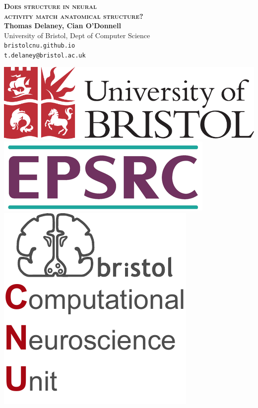 \documentclass[a0,portrait]{a0poster}
\begin{document}

\begin{minipage}[b]{0.75\linewidth}
  \veryHuge \color{NavyBlue} \textbf{\textsc{Does structure in neural \\[0.3cm] activity match anatomical structure?}} \color{Black}\\[1cm] %
  \huge \textbf{Thomas Delaney, Cian O'Donnell}\\[0.3cm] %
  \huge University of Bristol, Dept of Computer Science\\[0.1cm] %
  \large \texttt{bristolcnu.github.io} \\
  \Large \texttt{t.delaney@bristol.ac.uk} \\
\end{minipage}
%
\begin{minipage}[b]{0.24\linewidth}
  \centering
  \includegraphics[width=0.475\linewidth]{bristol_university_logo.png} \vspace{0.3cm}\\
  \includegraphics[width=0.475\linewidth]{epsrc_logo.png} \\
  \includegraphics[width=0.475\linewidth]{BCNU_logo.pdf}
\end{minipage}
\end{document}
